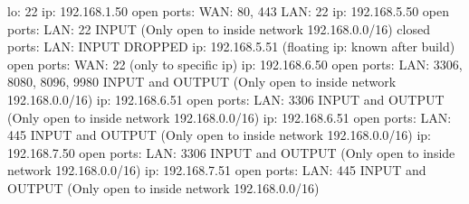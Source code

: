\markdownRendererInterblockSeparator
{}\markdownRendererInterblockSeparator
{}lo: 22\markdownRendererInterblockSeparator
{}\markdownRendererInterblockSeparator
{}ip: 192.168.1.50\markdownRendererLineBreak
{}open ports:\markdownRendererLineBreak
{}WAN: 80, 443\markdownRendererLineBreak
{}LAN: 22\markdownRendererInterblockSeparator
{}\markdownRendererInterblockSeparator
{}ip: 192.168.5.50\markdownRendererLineBreak
{}open ports:\markdownRendererLineBreak
{}LAN: 22 INPUT\markdownRendererLineBreak
{}(Only open to inside network 192.168.0.0/16)\markdownRendererLineBreak
{}closed ports:\markdownRendererLineBreak
{}LAN: INPUT DROPPED\markdownRendererInterblockSeparator
{}\markdownRendererInterblockSeparator
{}ip: 192.168.5.51 (floating ip: known after build)\markdownRendererLineBreak
{}open ports:\markdownRendererLineBreak
{}WAN: 22\markdownRendererLineBreak
{}(only to specific ip)\markdownRendererInterblockSeparator
{}\markdownRendererInterblockSeparator
{}ip: 192.168.6.50\markdownRendererLineBreak
{}open ports:\markdownRendererLineBreak
{}LAN: 3306, 8080, 8096, 9980 INPUT and OUTPUT\markdownRendererLineBreak
{}(Only open to inside network 192.168.0.0/16)\markdownRendererInterblockSeparator
{}\markdownRendererInterblockSeparator
{}ip: 192.168.6.51\markdownRendererLineBreak
{}open ports:\markdownRendererLineBreak
{}LAN: 3306 INPUT and OUTPUT\markdownRendererLineBreak
{}(Only open to inside network 192.168.0.0/16)\markdownRendererInterblockSeparator
{}\markdownRendererInterblockSeparator
{}ip: 192.168.6.51\markdownRendererLineBreak
{}open ports:\markdownRendererLineBreak
{}LAN: 445 INPUT and OUTPUT\markdownRendererLineBreak
{}(Only open to inside network 192.168.0.0/16)\markdownRendererInterblockSeparator
{}\markdownRendererInterblockSeparator
{}ip: 192.168.7.50\markdownRendererLineBreak
{}open ports:\markdownRendererLineBreak
{}LAN: 3306 INPUT and OUTPUT\markdownRendererLineBreak
{}(Only open to inside network 192.168.0.0/16)\markdownRendererInterblockSeparator
{}\markdownRendererInterblockSeparator
{}ip: 192.168.7.51\markdownRendererLineBreak
{}open ports:\markdownRendererLineBreak
{}LAN: 445 INPUT and OUTPUT\markdownRendererLineBreak
{}(Only open to inside network 192.168.0.0/16)\relax